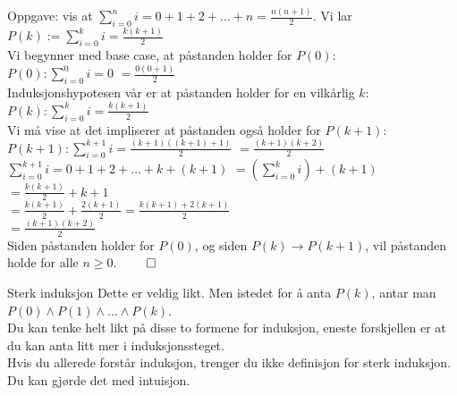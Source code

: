 \begin{frame}{Oppgave: vis at $\sum_{i=0}^{n} i = 0 + 1 + 2 + \ldots + n = \frac{n(n+1)}{2}$.}
    \pause    
    Vi lar $P(k) := \sum_{i=0}^{k} i = \frac{k(k+1)}{2}$\\

    \pause
    Vi begynner med base case, at påstanden holder for $P(0)$:\\
    $P(0): \sum_{i=0}^{0} i = 0$ \pause $ = \frac{0(0+1)}{2}$ \checkmark\\
    
    \pause
    Induksjonshypotesen vår er at påstanden holder for en vilkårlig $k$: \\
    $P(k): \sum_{i=0}^{k} i = \frac{k(k+1)}{2}$\\
    \pause
    Vi må vise at det impliserer at påstanden også holder for $P(k+1)$:\\
    $P(k+1): \sum_{i=0}^{k+1} i = \frac{(k+1)((k+1)+1)}{2}$ \pause $ = \frac{(k+1)(k+2)}{2}$\\

    \pause
    $\sum_{i=0}^{k+1} i = 0 + 1 + 2 + \ldots + k + (k+1)$ \pause $= (\sum_{i=0}^{k} i )+ (k+1)$\\
    \pause
    $=\frac{k(k+1)}{2} + k + 1$\\
    \pause
    $= \frac{k(k+1)}{2}+\frac{2(k+1)}{2} = \frac{k(k+1)+2(k+1)}{2}$\\
    \pause
    $= \frac{(k+1)(k+2)}{2}$ \pause \checkmark \\[2mm]
    \pause
    Siden påstanden holder for $P(0)$, og siden $P(k) \rightarrow P(k+1)$, vil påstanden holde for alle $n \geq 0$. $\qed$
\end{frame}

\begin{frame}{Sterk induksjon}
    Dette er veldig likt. Men istedet for å anta $P(k)$, antar man $P(0) \land P(1) \land \ldots \land P(k)$.\\
    Du kan tenke helt likt på disse to formene for induksjon, eneste forskjellen er at du kan anta litt mer i induksjonssteget.\\

    Hvis du allerede forstår induksjon, trenger du ikke definisjon for sterk induksjon. Du kan gjørde det med intuisjon.
\end{frame}

